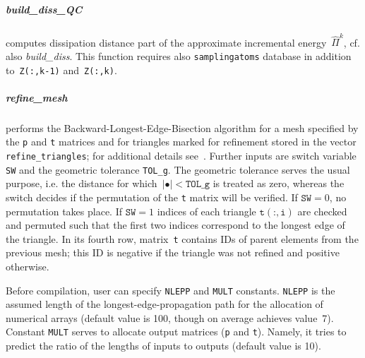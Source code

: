 \documentclass[preprint,12pt,authoryear]{elsarticle}
\begin{document}
%
%
\subparagraph{build\_diss\_QC} computes dissipation distance part of the approximate incremental energy~$\widehat{\Pi}^k$, cf. also \emph{build\_diss}. This function requires also \texttt{samplingatoms} database in addition to~\texttt{Z(:,k-1)} and~\texttt{Z(:,k)}.
%
%
\subparagraph{refine\_mesh} performs the Backward-Longest-Edge-Bisection algorithm for a mesh specified by the \texttt{p} and \texttt{t} matrices and for triangles marked for refinement stored in the vector \texttt{refine\_triangles}; for additional details see~\cite{Rivara:LEPP}. Further inputs are switch variable \texttt{SW} and the geometric tolerance \texttt{TOL\_g}. The geometric tolerance serves the usual purpose, i.e. the distance for which~$|\bullet| < \texttt{TOL\_g}$ is treated as zero, whereas the switch decides if the permutation of the \texttt{t} matrix will be verified. If $\texttt{SW}=0$, no permutation takes place. If $\texttt{SW}=1$ indices of each triangle $\texttt{t}(\texttt{:},\texttt{i})$ are checked and permuted such that the first two indices correspond to the longest edge of the triangle. In its fourth row, matrix~\texttt{t} contains IDs of parent elements from the previous mesh; this ID is negative if the triangle was not refined and positive otherwise.

Before compilation, user can specify \texttt{NLEPP} and \texttt{MULT} constants.
\texttt{NLEPP} is the assumed length of the longest-edge-propagation path for the allocation of numerical arrays (default value is 100, though on average achieves value~7). Constant \texttt{MULT} serves to allocate output matrices (\texttt{p} and \texttt{t}). Namely, it tries to predict the ratio of the lengths of inputs to outputs (default value is 10).
%
%
\end{document}
